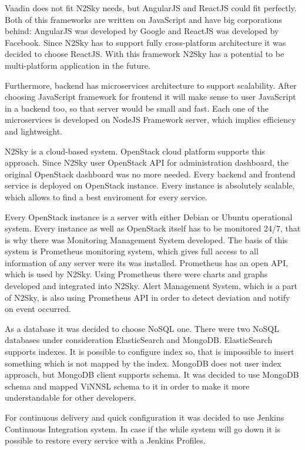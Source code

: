  Vaadin does not fit N2Sky needs, but AngularJS and ReactJS could fit perfectly. Both of this frameworks are written on JavaScript and have big corporations behind: AngularJS was developed by Google and ReactJS was developed by Facebook. Since N2Sky has to support fully cross-platform architecture it was decided to choose ReactJS. With this framework N2Sky has a potential to be multi-platform application in the future. 
 

Furthermore, backend has microservices architecture to support scalability. After choosing JavaScript framework for frontend it will make sense to user JavaScript in a backend too, so that server would be small and fast. Each one of the microservices is developed on NodeJS Framework server, which implies efficiency and lightweight. 

N2Sky is a cloud-based system. OpenStack cloud platform supports this approach. Since N2Sky user OpenStack API for administration dashboard, the original OpenStack dashboard was no more needed. Every backend and frontend service is deployed on OpenStack instance. Every instance is absolutely scalable, which allows to find a best enviroment for every service. 

Every OpenStack instance is a server with either Debian or Ubuntu operational system. Every instance as well as OpenStack itself has to be monitored 24/7, that is why there was Monitoring Management System developed. The basis of this system is Prometheus monitoring system, which gives full access to all information of any server were its was installed. Prometheus has an open API, which is used by N2Sky. Using Prometheus there were charts and graphs developed and integrated into N2Sky. Alert Management System, which is a part of N2Sky, is also using  Prometheus API in order to detect deviation and notify on event occurred.

As a database it was decided to choose NoSQL one. There were two NoSQL databases under consideration ElasticSearch and MongoDB. 
ElasticSearch supports indexes. It is possible to configure index so, that is impossible to insert something which is not mapped by the index.  MongoDB does not user index approach, but MongoDB client supports schema. It was decided to use MongoDB schema and mapped ViNNSL schema to it in order to make it more understandable for other developers. 

For continuous delivery and quick configuration it was decided to use Jenkins Continuous Integration system. In case if the while system will go down it is possible to restore every service with a Jenkins Profiles.


